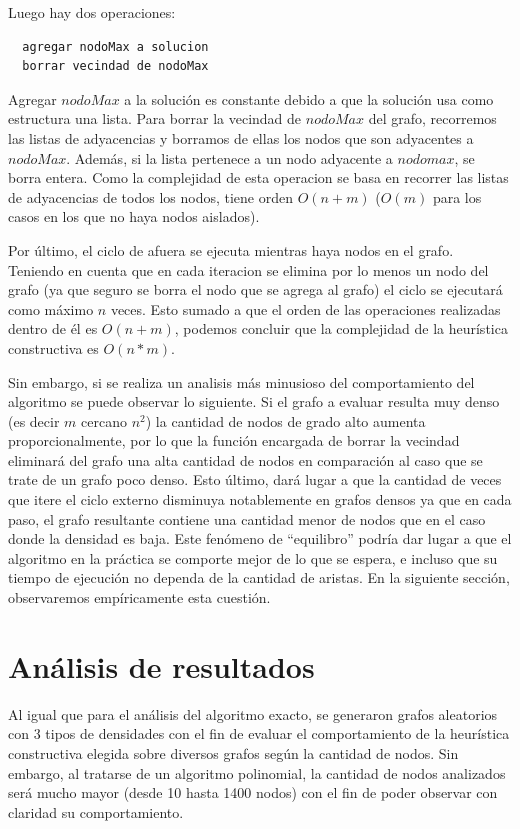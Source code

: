 \documentclass[a4paper,11pt] {article}
\begin{document}
Luego hay dos operaciones:
\begin{verbatim}
  agregar nodoMax a solucion
  borrar vecindad de nodoMax
\end{verbatim}

Agregar $nodoMax$ a la solución es constante debido a que la solución usa como estructura una lista. Para borrar la vecindad de $nodoMax$ del grafo, recorremos las listas de adyacencias y borramos de ellas los nodos que son adyacentes a $nodoMax$. Además, si la lista pertenece a un nodo adyacente a $nodomax$, se borra entera. Como la complejidad de esta operacion se basa en recorrer las listas de adyacencias de todos los nodos, tiene orden $O(n + m)$ ($O(m)$ para los casos en los que no haya nodos aislados).

Por último, el ciclo de afuera se ejecuta mientras haya nodos en el grafo. Teniendo en cuenta que en cada iteracion se elimina por lo menos un nodo del grafo (ya que seguro se borra el nodo que se agrega al grafo) el ciclo se ejecutará como máximo $n$ veces. Esto sumado a que el orden de las operaciones realizadas dentro de él es $O(n + m)$, podemos concluir que la complejidad de la heurística constructiva es $O(n * m)$.

Sin embargo, si se realiza un analisis más minusioso del comportamiento del algoritmo se puede observar lo siguiente. Si el grafo a evaluar resulta muy denso (es decir $m$ cercano $n^2$) la cantidad de nodos de grado alto aumenta proporcionalmente, por lo que la función encargada de borrar la vecindad eliminará del grafo una alta cantidad de nodos en comparación al caso que se trate de un grafo poco denso. Esto último, dará lugar a que la cantidad de veces que itere el ciclo externo disminuya notablemente en grafos densos ya que en cada paso, el grafo resultante contiene una cantidad menor de nodos que en el caso donde la densidad es baja. Este fenómeno de ``equilibro'' podría dar lugar a que el algoritmo en la práctica se comporte mejor de lo que se espera, e incluso que su tiempo de ejecución no dependa de la cantidad de aristas. En la siguiente sección, observaremos empíricamente esta cuestión.

\section*{An\'alisis de resultados}

Al igual que para el análisis del algoritmo exacto, se generaron grafos aleatorios con 3 tipos de densidades con el fin de evaluar el comportamiento de la heurística constructiva elegida sobre diversos grafos según la cantidad de nodos. Sin embargo, al tratarse de un algoritmo polinomial, la cantidad de nodos analizados será mucho mayor (desde 10 hasta 1400 nodos) con el fin de poder observar con claridad su comportamiento.
\end{document}
